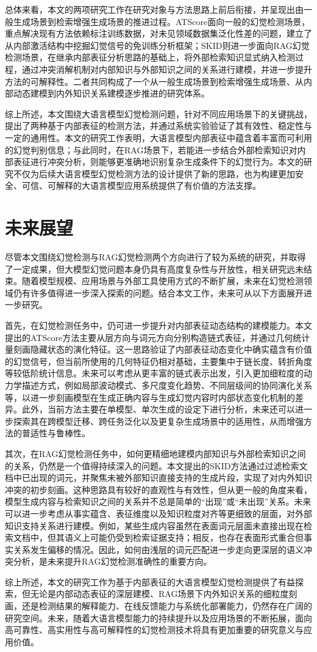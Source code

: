 总体来看，本文的两项研究工作在研究对象与方法思路上前后衔接，并呈现出由一般生成场景到检索增强生成场景的推进过程。ATScore面向一般的幻觉检测场景，重点解决现有方法依赖标注训练数据，对未见领域数据集泛化性差的问题，建立了从内部激活结构中挖掘幻觉信号的免训练分析框架；SKID则进一步面向RAG幻觉检测场景，在继承内部表征分析思路的基础上，将外部检索知识显式纳入检测过程，通过冲突消解机制对内部知识与外部知识之间的关系进行建模，并进一步提升方法的可解释性。二者共同构成了一个从一般生成场景到检索增强生成场景、从内部动态建模到内外知识关系建模逐步推进的研究体系。

综上所述，本文围绕大语言模型幻觉检测问题，针对不同应用场景下的关键挑战，提出了两种基于内部表征的检测方法，并通过系统实验验证了其有效性、稳定性与一定的通用性。本文的研究工作表明，大语言模型内部表征中蕴含着丰富而可利用的幻觉判别信息；与此同时，在RAG场景下，若能进一步结合外部检索知识对内部表征进行冲突分析，则能够更准确地识别复杂生成条件下的幻觉行为。本文的研究不仅为后续大语言模型幻觉检测方法的设计提供了新的思路，也为构建更加安全、可信、可解释的大语言模型应用系统提供了有价值的方法支撑。

\section{未来展望}

尽管本文围绕幻觉检测与RAG幻觉检测两个方向进行了较为系统的研究，并取得了一定成果，但大模型幻觉问题本身仍具有高度复杂性与开放性，相关研究远未结束。随着模型规模、应用场景与外部工具使用方式的不断扩展，未来在幻觉检测领域仍有许多值得进一步深入探索的问题。结合本文工作，未来可从以下方面展开进一步研究。

首先，在幻觉检测任务中，仍可进一步提升对内部表征动态结构的建模能力。本文提出的ATScore方法主要从层方向与词元方向分别构造链式表征，并通过几何统计量刻画隐藏状态的演化特征。这一思路验证了内部表征动态变化中确实蕴含有价值的幻觉信号，但当前所使用的几何特征仍相对基础，主要集中于链长度、转折角度等较低阶统计信息。未来可以考虑从更丰富的链式表示出发，引入更加细粒度的动力学描述方式，例如局部波动模式、多尺度变化趋势、不同层级间的协同演化关系等，以进一步刻画模型在生成正确内容与生成幻觉内容时内部状态变化机制的差异。此外，当前方法主要在单模型、单次生成的设定下进行分析，未来还可以进一步探索其在跨模型迁移、跨任务泛化以及更复杂生成场景中的适用性，从而增强方法的普适性与鲁棒性。

其次，在RAG幻觉检测任务中，如何更精细地建模内部知识与外部检索知识之间的关系，仍然是一个值得持续深入的问题。本文提出的SKID方法通过过滤检索文档中已出现的词元，并聚焦未被外部知识直接支持的生成片段，实现了对内外知识冲突的初步刻画。这种思路具有较好的直观性与有效性，但从更一般的角度来看，模型生成内容与检索知识之间的关系并不总是简单的“出现”或“未出现”关系。未来可以进一步考虑从事实蕴含、表征维度以及知识粒度对齐等更细致的层面，对外部知识支持关系进行建模。例如，某些生成内容虽然在表面词元层面未直接出现在检索文档中，但其语义上可能仍受到检索证据支持；相反，也存在表面形式重合但事实关系发生偏移的情况。因此，如何由浅层的词元匹配进一步走向更深层的语义冲突分析，是未来提升RAG幻觉检测准确性的重要方向。

综上所述，本文的研究工作为基于内部表征的大语言模型幻觉检测提供了有益探索，但无论是内部动态表征的深层建模、RAG场景下内外知识关系的细粒度刻画，还是检测结果的解释能力、在线反馈能力与系统化部署能力，仍然存在广阔的研究空间。未来，随着大语言模型能力的持续提升以及应用场景的不断拓展，面向高可靠性、高实用性与高可解释性的幻觉检测技术将具有更加重要的研究意义与应用价值。
